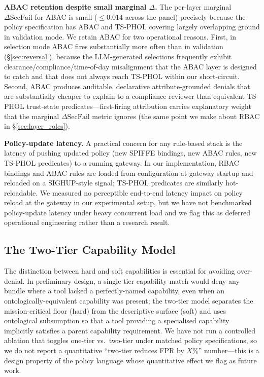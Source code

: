 \documentclass[10pt,a4paper,twocolumn]{article}
\begin{document}
\textbf{ABAC retention despite small marginal $\Delta$.} The per-layer marginal $\Delta\mathrm{SecFail}$ for ABAC is small ($\leq 0.014$ across the panel) precisely because the policy specification has ABAC and TS-PHOL covering largely overlapping ground in validation mode. We retain ABAC for two operational reasons. First, in selection mode ABAC fires substantially more often than in validation (\S\ref{sec:reversal}), because the LLM-generated selections frequently exhibit clearance/compliance/time-of-day misalignment that the ABAC layer is designed to catch and that does not always reach TS-PHOL within our short-circuit. Second, ABAC produces auditable, declarative attribute-grounded denials that are substantially cheaper to explain to a compliance reviewer than equivalent TS-PHOL trust-state predicates---first-firing attribution carries explanatory weight that the marginal $\Delta\mathrm{SecFail}$ metric ignores (the same point we make about RBAC in \S\ref{sec:layer_roles}).

\textbf{Policy-update latency.} A practical concern for any rule-based stack is the latency of pushing updated policy (new SPIFFE bindings, new ABAC rules, new TS-PHOL predicates) to a running gateway. In our implementation, RBAC bindings and ABAC rules are loaded from configuration at gateway startup and reloaded on a SIGHUP-style signal; TS-PHOL predicates are similarly hot-reloadable. We measured no perceptible end-to-end latency impact on policy reload at the gateway in our experimental setup, but we have not benchmarked policy-update latency under heavy concurrent load and we flag this as deferred operational engineering rather than a research result.

\subsection{The Two-Tier Capability Model}
\label{sec:two_tier_discussion}

The distinction between hard and soft capabilities is essential for avoiding over-denial. In preliminary design, a single-tier capability match would deny any bundle where a tool lacked a perfectly-named capability, even when an ontologically-equivalent capability was present; the two-tier model separates the mission-critical floor (hard) from the descriptive surface (soft) and uses ontological subsumption so that a tool providing a specialised capability implicitly satisfies a parent capability requirement. We have not run a controlled ablation that toggles one-tier vs.\ two-tier under matched policy specifications, so we do not report a quantitative ``two-tier reduces FPR by $X\%$'' number---this is a design property of the policy language whose quantitative effect we flag as future work.
\end{document}
